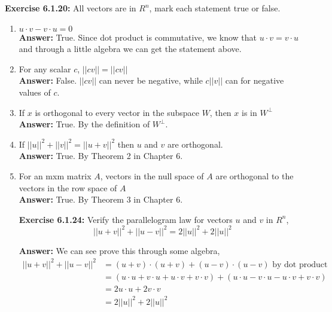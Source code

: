\documentclass{amsart}
\begin{document}
\begin{enumerate}
\noindent\textbf{Exercise 6.1.20: } All vectors are in $R^n$, mark each statement true or false.\\
\begin{enumerate}

\item $u\cdot v - v \cdot u = 0$\\
\noindent \textbf{Answer: } True. Since dot product is commutative, we know that $ u\cdot v  = v \cdot u$ and through a little algebra we can get the statement above. 
\vspace{1in}

\item For any scalar $c$, $||cv|| = ||cv||$\\
\noindent \textbf{Answer: } False. $||cv||$ can never be negative, while $c||v||$ can for negative values of $c$. 
\vspace{1in}

\item If $x$ is orthogonal to every vector in the subspace $W$, then $x$ is in $W^{\perp}$\\
\noindent \textbf{Answer: }True. By the definition of $W^{\perp}$.
\vspace{1in}


\item If $||u||^2 + ||v||^2 = ||u+v||^2$ then $u$ and $v$ are orthogonal.\\
\noindent \textbf{Answer: }True. By Theorem 2 in Chapter 6.
\vspace{1in}


\item For an mxm matrix $A$, vectors in the null space of $A$ are orthogonal to the vectors in the row space of $A$\\
\noindent \textbf{Answer: }True. By Theorem 3 in Chapter 6.
\vspace{1in}




\noindent\textbf{Exercise 6.1.24: } Verify the parallelogram law for vectors $u$ and $v$ in $R^n$,
\begin{equation*}
||u+v||^2+||u-v||^2 = 2||u||^2+2||u||^2
\end{equation*}

\noindent \textbf{Answer: } We can see prove this through some algebra,
\begin{align*}
||u+v||^2+||u-v||^2 &=(u+v) \cdot (u+v) + (u-v) \cdot (u-v) \text{ by dot product}\\
&=(u \cdot u + v \cdot u + u \cdot v + v \cdot v) + (u \cdot u - v \cdot u - u \cdot v + v \cdot v) \\
&= 2 u\cdot u + 2 v \cdot v\\
&= 2||u||^2+2||u||^2
\end{align*}
\vspace{1in}





\end{enumerate}
\end{enumerate}
\end{document}

